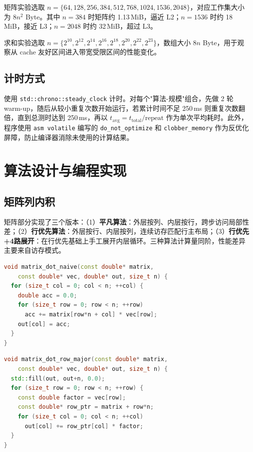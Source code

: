 \documentclass[a4paper,11pt,UTF8]{ctexart}
\begin{document}
矩阵实验选取 $n=\{64,128,256,384,512,768,1024,1536,2048\}$，对应工作集大小为 $8n^2$ Byte。其中 $n=384$ 时矩阵约 1.13\,MiB，逼近 L2；$n=1536$ 时约 18\,MiB，接近 L3；$n=2048$ 时约 32\,MiB，超过 L3。

求和实验选取 $n=\{2^{10},2^{12},2^{14},2^{16},2^{18},2^{20},2^{22},2^{23}\}$，数组大小 $8n$ Byte，用于观察从 cache 友好区间进入带宽受限区间的性能变化。

\subsection{计时方式}
使用 \texttt{std::chrono::steady\_clock} 计时。对每个"算法-规模"组合，先做 2 轮 warm-up，随后从较小重复次数开始运行，若累计时间不足 250\,ms 则重复次数翻倍，直到总测时达到 250\,ms，再以 $t_{\text{avg}} = t_{\text{total}}/\text{repeat}$ 作为单次平均耗时。此外，程序使用 \texttt{asm volatile} 编写的 \texttt{do\_not\_optimize} 和 \texttt{clobber\_memory} 作为反优化屏障，防止编译器消除未使用的计算结果。

\section{算法设计与编程实现}
\subsection{矩阵列内积}
矩阵部分实现了三个版本：（1）\textbf{平凡算法}：外层按列、内层按行，跨步访问局部性差；（2）\textbf{行优先算法}：外层按行、内层按列，连续访存匹配行主布局；（3）\textbf{行优先+4路展开}：在行优先基础上手工展开内层循环。三种算法计算量同阶，性能差异主要来自访存模式。

\begin{lstlisting}[language=C++,caption=平凡算法（逐列访问）]
void matrix_dot_naive(const double* matrix,
    const double* vec, double* out, size_t n) {
  for (size_t col = 0; col < n; ++col) {
    double acc = 0.0;
    for (size_t row = 0; row < n; ++row)
      acc += matrix[row*n + col] * vec[row];
    out[col] = acc;
  }
}
\end{lstlisting}

\begin{lstlisting}[language=C++,caption=行优先算法（cache 友好）]
void matrix_dot_row_major(const double* matrix,
    const double* vec, double* out, size_t n) {
  std::fill(out, out+n, 0.0);
  for (size_t row = 0; row < n; ++row) {
    const double factor = vec[row];
    const double* row_ptr = matrix + row*n;
    for (size_t col = 0; col < n; ++col)
      out[col] += row_ptr[col] * factor;
  }
}
\end{lstlisting}
\end{document}
